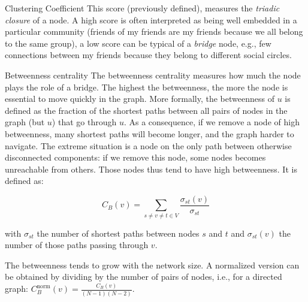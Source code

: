 \begin{textbox}{Clustering Coefficient}
    This score (previously defined), measures the \textit{triadic closure} of a node. A high score is often interpreted as being well embedded in a particular community (friends of my friends are my friends because we all belong to the same group), a low score can be typical of a \textit{bridge} node, e.g., few connections between my friends because they belong to different social circles.
\end{textbox}


\begin{textbox}{Betweenness centrality}
    The betweenness centrality measures how much the node plays the role of a bridge. The highest the betweenness, the more the node is essential to move quickly in the graph. More formally, the betweenness of $u$ is defined as the fraction of the shortest paths between all pairs of nodes in the graph (but $u$) that go through $u$. As a consequence, if we remove a node of high betweenness, many shortest paths will become longer, and the graph harder to navigate. The extreme situation is a node on the only path between otherwise disconnected components: if we remove this node, some nodes becomes unreachable from others. Those nodes thus tend to have high betweenness. It is defined as:

    \[ C_{B}(v)=\sum _{s\neq v\neq t\in V}{\frac {\sigma _{st}(v)}{\sigma _{st}}}\]

    with $\sigma _{st}$ the number of shortest paths between nodes $s$ and $t$ and $\sigma _{st}(v)$ the number of those paths passing through $v$.

    The betweenness tends to grow with the network size. A normalized version can be obtained by dividing by the number of pairs of nodes, i.e., for a directed graph: $C_{B}^{\text{norm}}(v)=\frac{C_{B}(v)}{(N-1)(N-2)}$.
\end{textbox}


